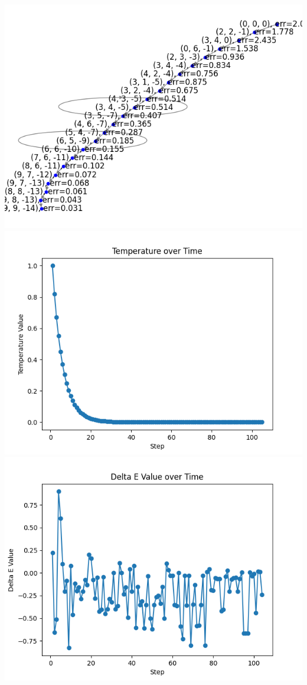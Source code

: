 \documentclass{article}
\begin{document}
\includegraphics[width=6in]{_static/Figure_3_Temp=1.2_Path=23.png}
\includegraphics[width=6in]{_static/Figure_6_Temp=1.2_Temp-over-Time.png}
\includegraphics[width=6in]{_static/Figure_9_Temp=1.22_Delta-E-over-Time.png}
\end{document}

